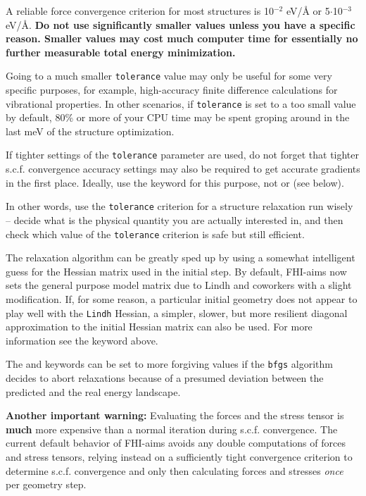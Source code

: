 A reliable force convergence criterion  for most
structures is 10$^{-2}$ eV/{\AA} or 5$\cdot$10$^{-3}$ eV/{\AA}. 
\textbf{Do not use significantly smaller values unless you have a specific 
reason. Smaller values may cost much computer time for essentially no
further measurable total energy minimization.}

Going to a much smaller \texttt{tolerance} value may only be useful for
some very specific purposes, for example, high-accuracy finite difference
calculations for vibrational properties. In other scenarios, if
\texttt{tolerance} is set to a too small value by default, 80\% or
more of your CPU time may be spent groping around in the last meV of
the structure optimization.

If tighter settings of the \texttt{tolerance} parameter are used,
do not forget that tighter s.c.f. convergence accuracy settings
may also be required to get accurate gradients in the first
place. Ideally, use the  keyword for this
purpose, not  or
 (see below).

In other words, use the \texttt{tolerance} criterion for a structure
relaxation run wisely -- decide what is the physical quantity you are
actually interested in, and then check which value of the
\texttt{tolerance} criterion is safe but still efficient.

The relaxation algorithm can be greatly sped up by using a somewhat
intelligent guess for the Hessian matrix used in the initial step. 
By default, FHI-aims now sets the general purpose model matrix due to Lindh
and coworkers \cite{Lin95} with a slight modification. If, for some
reason, a particular initial geometry does not appear to play well
with the \texttt{Lindh} Hessian, a simpler, slower, but more resilient
diagonal approximation to the initial Hessian matrix can also be used.
For more information
see the  keyword above.

The  and
 keywords can be set to more
forgiving values if the \texttt{bfgs} algorithm decides to 
abort relaxations because of a presumed deviation between the
predicted and the real energy landscape.

\textbf{Another important warning:} Evaluating the forces and
the stress tensor is \textbf{much} more expensive than a normal
iteration during s.c.f. convergence. The current default behavior of
FHI-aims avoids any double computations of forces and stress tensors,
relying instead on a sufficiently tight convergence criterion
 to determine s.c.f. convergence and only
then calculating forces and stresses \emph{once} per geometry step. 

